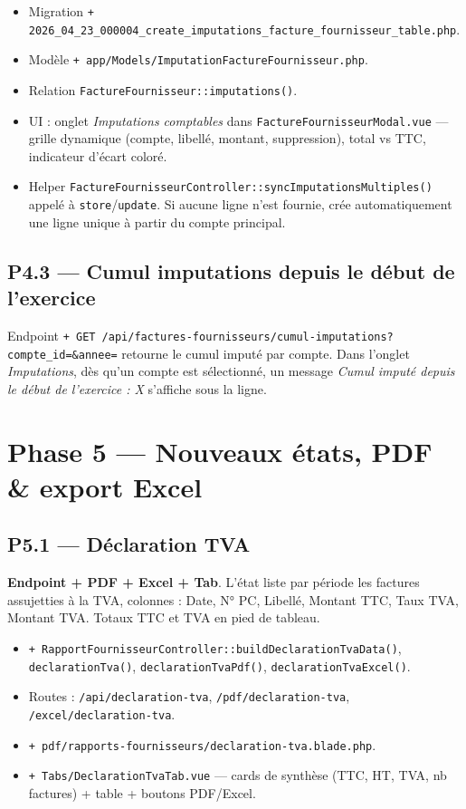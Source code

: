 \documentclass[11pt,a4paper]{article}
\newcommand{\modfile}[1]{\texttt{\small #1}}
\newcommand{\newfile}[1]{\texttt{\small\textcolor{accent}{+ #1}}}
\begin{document}
\begin{itemize}[leftmargin=1.4em]
  \item Migration \newfile{2026\_04\_23\_000004\_create\_imputations\_facture\_fournisseur\_table.php}.
  \item Modèle \newfile{app/Models/ImputationFactureFournisseur.php}.
  \item Relation \texttt{FactureFournisseur::imputations()}.
  \item UI : onglet \emph{Imputations comptables} dans
    \modfile{FactureFournisseurModal.vue} --- grille dynamique (compte, libellé,
    montant, suppression), total vs TTC, indicateur d'écart coloré.
  \item Helper \modfile{FactureFournisseurController::syncImputationsMultiples()}
    appelé à \texttt{store}/\texttt{update}. Si aucune ligne n'est fournie, crée
    automatiquement une ligne unique à partir du compte principal.
\end{itemize}

\subsection{P4.3 --- Cumul imputations depuis le début de l'exercice}

Endpoint \newfile{GET /api/factures-fournisseurs/cumul-imputations?compte\_id=\&annee=}
retourne le cumul imputé par compte. Dans l'onglet \emph{Imputations}, dès
qu'un compte est sélectionné, un message \emph{Cumul imputé depuis le début de
l'exercice : X} s'affiche sous la ligne.

\newpage

\section{Phase 5 --- Nouveaux états, PDF \& export Excel}

\subsection{P5.1 --- Déclaration TVA}

\textbf{Endpoint + PDF + Excel + Tab}. L'état liste par période les factures
assujetties à la TVA, colonnes : Date, N° PC, Libellé, Montant TTC, Taux TVA,
Montant TVA. Totaux TTC et TVA en pied de tableau.

\begin{itemize}[leftmargin=1.4em]
  \item \newfile{RapportFournisseurController::buildDeclarationTvaData()},
    \texttt{declarationTva()}, \texttt{declarationTvaPdf()},
    \texttt{declarationTvaExcel()}.
  \item Routes : \texttt{/api/declaration-tva}, \texttt{/pdf/declaration-tva},
    \texttt{/excel/declaration-tva}.
  \item \newfile{pdf/rapports-fournisseurs/declaration-tva.blade.php}.
  \item \newfile{Tabs/DeclarationTvaTab.vue} --- cards de synthèse (TTC, HT, TVA,
    nb factures) + table + boutons PDF/Excel.
\end{itemize}
\end{document}
